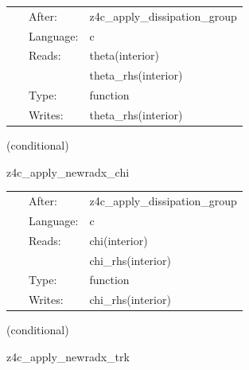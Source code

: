 \documentclass{article}
\begin{document}


\hspace{5mm}

 \begin{tabular*}{160mm}{cll} 
~ & After:  & z4c\_apply\_dissipation\_group \\ 
~ & Language:  & c \\ 
~ & Reads:  & theta(interior) \\ 
~& ~ &theta\_rhs(interior)\\ 
~ & Type:  & function \\ 
~ & Writes:  & theta\_rhs(interior) \\ 
\end{tabular*} 


\vspace{5mm}

   (conditional) 

\hspace{5mm} z4c\_apply\_newradx\_chi 



\hspace{5mm}

 \begin{tabular*}{160mm}{cll} 
~ & After:  & z4c\_apply\_dissipation\_group \\ 
~ & Language:  & c \\ 
~ & Reads:  & chi(interior) \\ 
~& ~ &chi\_rhs(interior)\\ 
~ & Type:  & function \\ 
~ & Writes:  & chi\_rhs(interior) \\ 
\end{tabular*} 


\vspace{5mm}

   (conditional) 

\hspace{5mm} z4c\_apply\_newradx\_trk 

\end{document}
